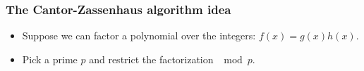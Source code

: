 \begin{frame}
\frametitle{The Cantor-Zassenhaus algorithm idea}
\begin{itemize}
\item Suppose we can factor a polynomial over the integers: $f(x)=g(x)h(x)$.
\item Pick a prime $p$ and restrict the factorization $\mod p$.
\end{itemize}
\end{frame}